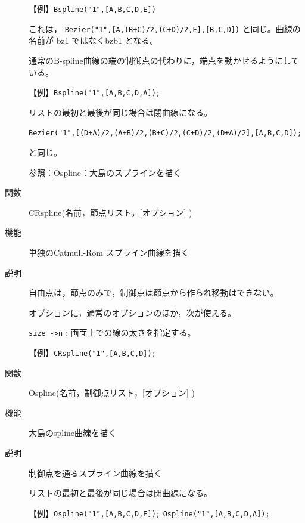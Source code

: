 \documentclass[papersize,a4paper,12pt,uplatex]{jsarticle}
\begin{document}
\begin{description}
 \vspace{\baselineskip}
【例】\verb|Bspline("1",[A,B,C,D,E])|

これは， \verb|Bezier("1",[A,(B+C)/2,(C+D)/2,E],[B,C,D])|  と同じ。曲線の名前が bz1 ではなくbzb1 となる。

通常のB-spline曲線の端の制御点の代わりに，端点を動かせるようにしている。

        \begin{center} \end{center}

【例】\verb|Bspline("1",[A,B,C,D,A]);|

リストの最初と最後が同じ場合は閉曲線になる。
  
 \verb|Bezier("1",[(D+A)/2,(A+B)/2,(B+C)/2,(C+D)/2,(D+A)/2],[A,B,C,D]);| 
 
 と同じ。

  \begin{center} \end{center}

参照：\hyperlink{ospline}{Ospline：大島のスプラインを描く} 

\vspace{\baselineskip}
\hypertarget{crspline}{}
\item[関数]  CRspline(名前，節点リスト，[オプション] )
\item[機能]  単独のCatmull-Rom スプライン曲線を描く
\item[説明]
自由点は，節点のみで，制御点は節点から作られ移動はできない。
  
オプションに，通常のオプションのほか，次が使える。

\verb|size ->n|  :  画面上での線の太さを指定する。

【例】\verb|CRspline("1",[A,B,C,D]);|

\hspace{20mm} 

\vspace{\baselineskip}
\hypertarget{ospline}{}
\item[関数]  Ospline(名前，制御点リスト，[オプション] )
\item[機能]  大島のspline曲線を描く
\item[説明]  制御点を通るスプライン曲線を描く

リストの最初と最後が同じ場合は閉曲線になる。

\vspace{\baselineskip}
【例】\verb|Ospline("1",[A,B,C,D,E]);|  \verb|Ospline("1",[A,B,C,D,A]);|


\end{description}
\end{document}
